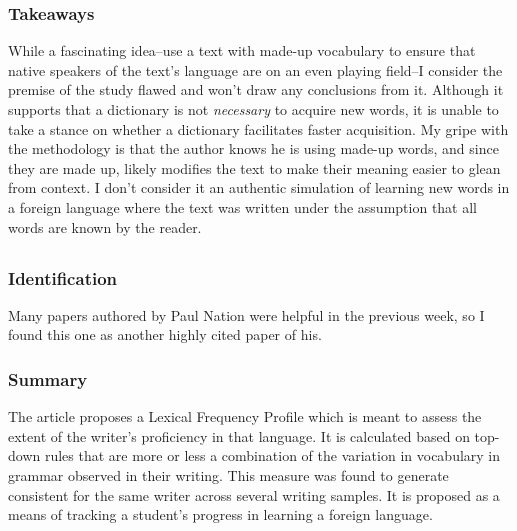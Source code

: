 \documentclass[
	letterpaper, %
]{jdf}
\begin{document}
\subsubsection{Takeaways}
While a fascinating idea–use a text with made-up vocabulary to ensure that native speakers of the text's language are on an even playing field–I consider the premise of the study flawed and won't draw any conclusions from it. Although it supports that a dictionary is not \textit{necessary} to acquire new words, it is unable to take a stance on whether a dictionary facilitates faster acquisition. My gripe with the methodology is that the author knows he is using made-up words, and since they are made up, likely modifies the text to make their meaning easier to glean from context. I don't consider it an authentic simulation of learning new words in a foreign language where the text was written under the assumption that all words are known by the reader.

\subsection{}
\subsubsection{Identification}
Many papers authored by Paul Nation were helpful in the previous week, so I found this one as another highly cited paper of his.

\subsubsection{Summary}
The article proposes a Lexical Frequency Profile which is meant to assess the extent of the writer's proficiency in that language. It is calculated based on top-down rules that are more or less a combination of the variation in vocabulary in grammar observed in their writing. This measure was found to generate consistent for the same writer across several writing samples. It is proposed as a means of tracking a student's progress in learning a foreign language.
\end{document}
